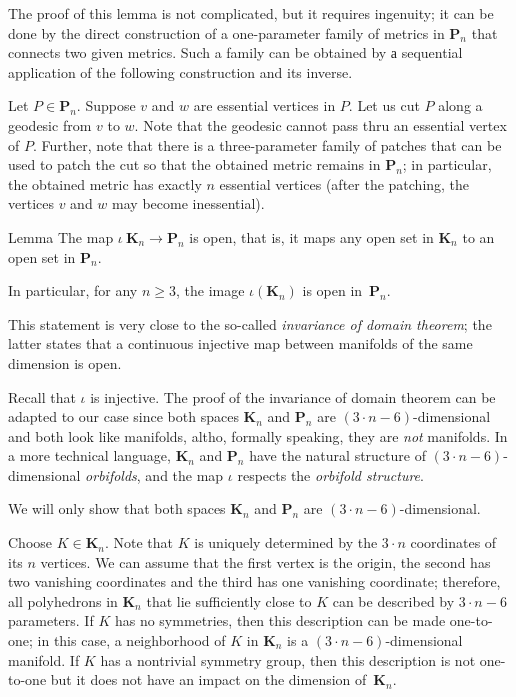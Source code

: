 The proof of this lemma is not complicated, but it requires ingenuity;
it can be done by the direct construction of a one-parameter family of metrics in $\mathbf{P}_n$ that connects two given metrics.
Such a family can be obtained by а sequential application of the following construction and its inverse.

Let $P\in\mathbf{P}_n$.
Suppose $v$ and $w$ are essential vertices in $P$.
Let us cut $P$ along a geodesic from $v$ to $w$.
Note that the geodesic cannot pass thru an essential vertex of $P$.
Further, note that there is a three-parameter family of patches that can be used to patch the cut so that the obtained metric remains in $\mathbf{P}_n$;
in particular, the obtained metric has exactly $n$ essential vertices (after the patching, the vertices $v$ and $w$ may become inessential).


\begin{thm}{Lemma}
The map $\iota\:\mathbf{K}_n\to\mathbf{P}_n$ is open,
that is, it maps any open set in $\mathbf{K}_n$ to an open set in $\mathbf{P}_n$.

In particular, for any $n\ge 3$, the image $\iota(\mathbf{K}_n)$ is open in~$\mathbf{P}_n$.
\end{thm}

This statement is very close to the so-called \textit{invariance of domain theorem};
the latter states that a continuous injective map between manifolds of the same dimension is open.

Recall that $\iota$ is injective.
The proof of the invariance of domain theorem can be adapted to our case since both spaces $\mathbf{K}_n$ and $\mathbf{P}_n$ are $(3\cdot n-6)$-dimensional and both look like manifolds, altho, formally speaking, they are \textit{not} manifolds.
In a more technical language, $\mathbf{K}_n$ and $\mathbf{P}_n$ have the natural structure of $(3\cdot n-6)$-dimensional \textit{orbifolds},
and the map $\iota$ respects the \textit{orbifold structure}.

We will only show that both spaces $\mathbf{K}_n$ and $\mathbf{P}_n$ are $(3\cdot n-6)$-dimensional.

Choose  $K\in\mathbf{K}_n$.
Note that $K$ is uniquely determined by the $3\cdot n$ coordinates of its $n$ vertices.
We can assume that the first vertex is the origin, the second has two vanishing coordinates and the third has one vanishing coordinate; therefore, all polyhedrons in $\mathbf{K}_n$ that lie sufficiently close to $K$ can be described by $3\cdot n-6$ parameters.
If $K$ has no symmetries, then this description can be made one-to-one;
in this case, a neighborhood of $K$ in $\mathbf{K}_n$ is a $(3\cdot n-6)$-dimensional manifold.
If $K$ has a nontrivial symmetry group, then this description is not one-to-one but it does not have an impact on the dimension of~$\mathbf{K}_n$.

